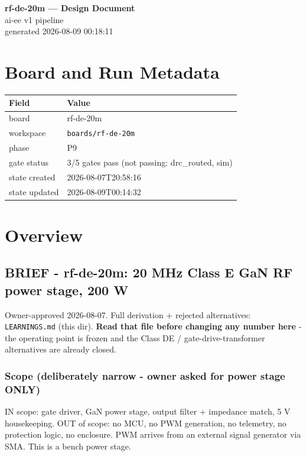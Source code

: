 \documentclass[11pt,a4paper]{article}
\begin{document}
\sloppy
\begin{center}
{\LARGE\bfseries rf-de-20m --- Design Document}\\[6pt]
{\large ai-ee v1 pipeline}\\[2pt]
generated 2026-08-09 00:18:11
\end{center}
\tableofcontents

\section{Board and Run Metadata}
{\small
\begin{longtable}{lp{11cm}}
\toprule
\textbf{Field} & \textbf{Value} \\
\midrule
\endhead
board & rf-de-20m \\
workspace & \texttt{boards/rf-de-20m} \\
phase & P9 \\
gate status & 3/5 gates pass (not passing: drc\_routed, sim) \\
state created & 2026-08-07T20:58:16 \\
state updated & 2026-08-09T00:14:32 \\
\bottomrule
\end{longtable}
}
\section{Overview}
\subsection*{BRIEF - rf-de-20m: 20 MHz Class E GaN RF power stage, 200 W}
Owner-approved 2026-08-07. Full derivation + rejected alternatives: \texttt{LEARNINGS.md} (this dir). \textbf{Read that file before changing any number here} - the operating point is frozen and the Class DE / gate-drive-transformer alternatives are already closed.

\subsubsection*{Scope (deliberately narrow - owner asked for power stage ONLY)}
IN scope: gate driver, GaN power stage, output filter + impedance match, 5 V housekeeping. OUT of scope: no MCU, no PWM generation, no telemetry, no protection logic, no enclosure. PWM arrives from an external signal generator via SMA. This is a bench power stage.
\end{document}
